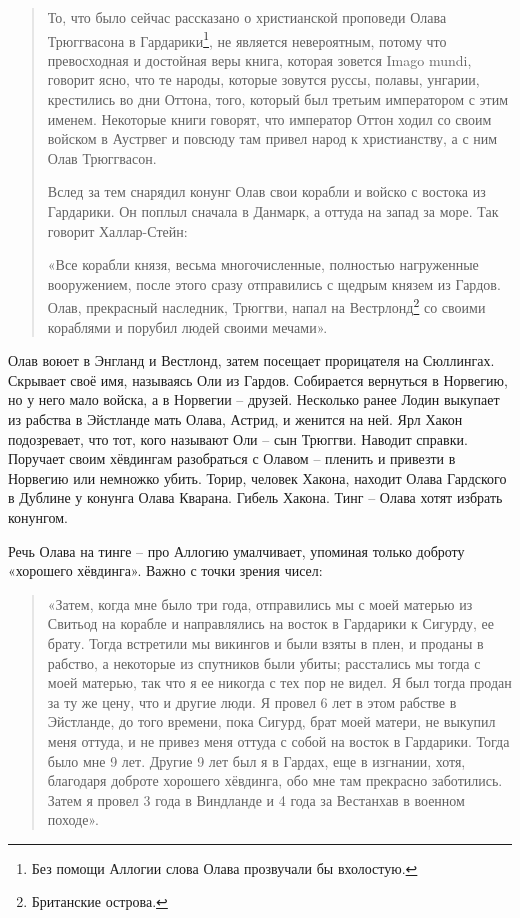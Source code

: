 \begin{quotation}
То, что было сейчас рассказано о христианской проповеди Олава Трюггвасона в Гардарики\footnote{Без помощи Аллогии слова Олава прозвучали бы вхолостую.}, не является невероятным, потому что превосходная и достойная веры книга, которая зовется Imago mundi, говорит ясно, что те народы, которые зовутся руссы, полавы, унгарии, крестились во дни Оттона, того, который был третьим императором с этим именем. Некоторые книги говорят, что император Оттон ходил со своим войском в Аустрвег и повсюду там привел народ к христианству, а с ним Олав Трюггвасон.

Вслед за тем снарядил конунг Олав свои корабли и войско с востока из Гардарики. Он поплыл сначала в Данмарк, а оттуда на запад за море. Так говорит Халлар-Стейн: 

«Все корабли князя, весьма многочисленные, полностью нагруженные вооружением, после этого сразу отправились с щедрым князем из Гардов. Олав, прекрасный наследник, Трюггви, напал на Вестрлонд\footnote{Британские острова.} со своими кораблями и порубил людей своими мечами».
\end{quotation}

Олав воюет в Энгланд и Вестлонд, затем посещает прорицателя на Сюллингах. Скрывает своё имя, называясь Оли из Гардов. Собирается вернуться в Норвегию, но у него мало войска, а в Норвегии – друзей. Несколько ранее Лодин выкупает из рабства в Эйстланде мать Олава, Астрид, и женится на ней. Ярл Хакон подозревает, что тот, кого называют Оли – сын Трюггви. Наводит справки. Поручает своим хёвдингам разобраться с Олавом – пленить и привезти в Норвегию или немножко убить. Торир, человек Хакона, находит Олава Гардского в Дублине у конунга Олава Кварана. Гибель Хакона. Тинг – Олава хотят избрать конунгом.

Речь Олава на тинге – про Аллогию умалчивает, упоминая только доброту «хорошего хёвдинга». Важно с точки зрения чисел:

\begin{quotation}
«Затем, когда мне было три года, отправились мы с моей матерью из Свитьод на корабле и направлялись на восток в Гардарики к Сигурду, ее брату. Тогда встретили мы викингов и были взяты в плен, и проданы в рабство, а некоторые из спутников были убиты; расстались мы тогда с моей матерью, так что я ее никогда с тех пор не видел. Я был тогда продан за ту же цену, что и другие люди. Я провел 6 лет в этом рабстве в Эйстланде, до того времени, пока Сигурд, брат моей матери, не выкупил меня оттуда, и не привез меня оттуда с собой на восток в Гардарики. Тогда было мне 9 лет. Другие 9 лет был я в Гардах, еще в изгнании, хотя, благодаря доброте хорошего хёвдинга, обо мне там прекрасно заботились. Затем я провел 3 года в Виндланде и 4 года за Вестанхав в военном походе».
\end{quotation}

